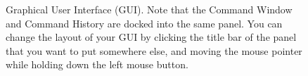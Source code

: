 \begin{figure}[!ht]
  \centering
  \caption{\MATLAB{} Graphical User Interface (GUI). Note that the Command Window and Command History are docked into the same panel. You can change the layout of your GUI by clicking the title bar of the panel that you want to put somewhere else, and moving the mouse pointer while holding down the left mouse button.}\label{fig:gui}

\end{figure}




